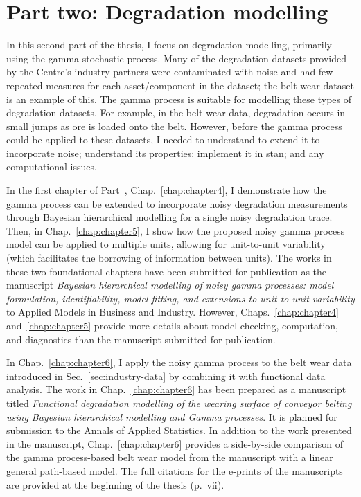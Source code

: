 \documentclass[apa,colorlinks,emptypage]{curtinThesis}
\begin{document}



\part{Part two: Degradation modelling}\label{part:two}

In this second part of the thesis, I focus on degradation modelling, primarily using the gamma stochastic process. Many of the degradation datasets provided by the Centre's industry partners were contaminated with noise and had few repeated measures for each asset/component in the dataset; the belt wear dataset is an example of this. The gamma process is suitable for modelling these types of degradation datasets. For example, in the belt wear data, degradation occurs in small jumps as ore is loaded onto the belt. However, before the gamma process could be applied to these datasets, I needed to understand to extend it to incorporate noise; understand its properties; implement it in stan; and any computational issues.

In the first chapter of Part~\ref{part:two}, Chap.~\ref{chap:chapter4}, I demonstrate how the gamma process can be extended to incorporate noisy degradation measurements through Bayesian hierarchical modelling for a single noisy degradation trace. Then, in Chap.~\ref{chap:chapter5}, I show how the proposed noisy gamma process model can be applied to multiple units, allowing for unit-to-unit variability (which facilitates the borrowing of information between units). The works in these two foundational chapters have been submitted for publication as the manuscript \textit{Bayesian hierarchical modelling of noisy gamma processes: model formulation, identifiability, model fitting, and extensions to unit-to-unit variability} to Applied Models in Business and Industry. However, Chaps.~\ref{chap:chapter4} and~\ref{chap:chapter5} provide more details about model checking, computation, and diagnostics than the manuscript submitted for publication.

In Chap.~\ref{chap:chapter6}, I apply the noisy gamma process to the belt wear data introduced in Sec.~\ref{sec:industry-data} by combining it with functional data analysis. The work in Chap.~\ref{chap:chapter6} has been prepared as a manuscript titled \textit{Functional degradation modelling of the wearing surface of conveyor belting using Bayesian hierarchical modelling and Gamma processes}. It is planned for submission to the Annals of Applied Statistics. In addition to the work presented in the manuscript, Chap.~\ref{chap:chapter6} provides a side-by-side comparison of the gamma process-based belt wear model from the manuscript with a linear general path-based model. The full citations for the e-prints of the manuscripts are provided at the beginning of the thesis (p.~vii).
\end{document}
